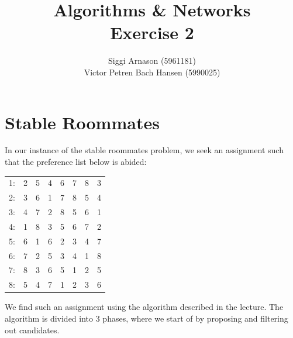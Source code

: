 \documentclass[a4paper]{article}
\author{Siggi Arnason (5961181) \\ Victor Petren Bach Hansen (5990025)}
\title{Algorithms \& Networks \\ Exercise 2}
\begin{document}
\maketitle
\section{Stable Roommates}
In our instance of the stable roommates problem, we seek an assignment such that the preference list below is abided:
\begin{center}
    \begin{tabular}{ | c || c  c  c  c  c  c  c |}
          \hline
              1: & 2 & 5 & 4 & 6 & 7 & 8 & 3 \\
              2: & 3 & 6 & 1 & 7 & 8 & 5 & 4 \\
              3: & 4 & 7 & 2 & 8 & 5 & 6 & 1 \\
              4: & 1 & 8 & 3 & 5 & 6 & 7 & 2 \\
              5: & 6 & 1 & 6 & 2 & 3 & 4 & 7 \\
              6: & 7 & 2 & 5 & 3 & 4 & 1 & 8 \\
              7: & 8 & 3 & 6 & 5 & 1 & 2 & 5 \\
              8: & 5 & 4 & 7 & 1 & 2 & 3 & 6 \\
          \hline
    \end{tabular}
\end{center}
We find such an assignment using the algorithm described in the lecture. The algorithm is divided into 3 phases, where we start of by proposing and filtering out candidates.\\
\end{document}
